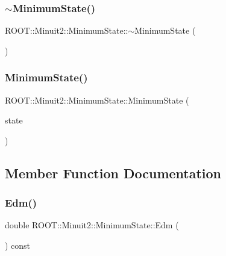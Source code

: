 \subsubsection{\texorpdfstring{$\sim$MinimumState()}{~MinimumState()}\hspace{0.1cm}{\footnotesize\ttfamily [2/2]}}
{\footnotesize\ttfamily R\+O\+O\+T\+::\+Minuit2\+::\+Minimum\+State\+::$\sim$\+Minimum\+State (\begin{DoxyParamCaption}{ }\end{DoxyParamCaption})\hspace{0.3cm}{\ttfamily [inline]}}

\mbox{\label{classROOT_1_1Minuit2_1_1MinimumState_a7e5a25f631c74fffd8cfd14d2268600e}} 
\subsubsection{\texorpdfstring{MinimumState()}{MinimumState()}\hspace{0.1cm}{\footnotesize\ttfamily [8/8]}}
{\footnotesize\ttfamily R\+O\+O\+T\+::\+Minuit2\+::\+Minimum\+State\+::\+Minimum\+State (\begin{DoxyParamCaption}\item[{const \mbox{\hyperlink{classROOT_1_1Minuit2_1_1MinimumState}{Minimum\+State}} \&}]{state }\end{DoxyParamCaption})\hspace{0.3cm}{\ttfamily [inline]}}



\subsection{Member Function Documentation}
\mbox{\label{classROOT_1_1Minuit2_1_1MinimumState_a397315b170efca9446f7d6a91bae6c59}} 
\subsubsection{\texorpdfstring{Edm()}{Edm()}\hspace{0.1cm}{\footnotesize\ttfamily [1/2]}}
{\footnotesize\ttfamily double R\+O\+O\+T\+::\+Minuit2\+::\+Minimum\+State\+::\+Edm (\begin{DoxyParamCaption}{ }\end{DoxyParamCaption}) const\hspace{0.3cm}{\ttfamily [inline]}}

